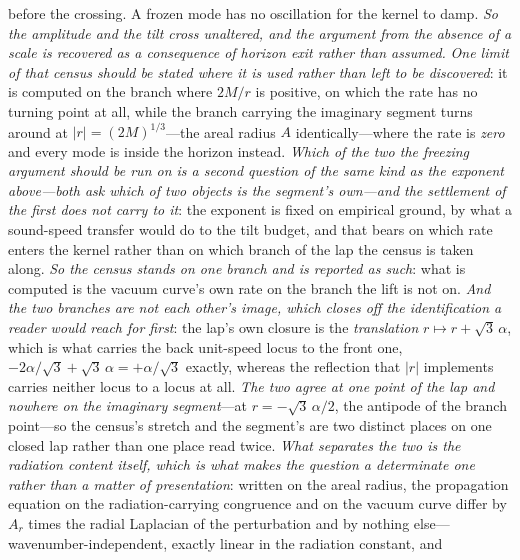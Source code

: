 \documentclass[11pt,a4paper]{article}
\theoremstyle{plain}
\theoremstyle{definition}
\theoremstyle{remark}
\begin{document}
before the crossing. A frozen mode has no oscillation for the kernel to damp. \emph{So the amplitude and the
tilt cross unaltered, and the argument from the absence of a scale is recovered as a consequence of horizon
exit rather than assumed.} \emph{One limit of that census should be stated where it is used rather than left
to be discovered}: it is computed on the branch where $2M/r$ is positive, on which the rate has no turning
point at all, while the branch carrying the imaginary segment turns around at
$\lvert r\rvert=(2M)^{1/3}$---the areal radius $A$ identically---where the rate is \emph{zero} and every mode
is inside the horizon instead. \emph{Which of the two the freezing argument should be run on is a second question of the same kind as the
exponent above---both ask which of two objects is the segment's own---and the settlement of the first does
not carry to it}: the exponent is fixed on empirical ground, by what a sound-speed transfer would do to the
tilt budget, and that bears on which rate enters the kernel rather than on which branch of the lap the census
is taken along. \emph{So the census stands on one branch and is reported as such}: what is computed is the
vacuum curve's own rate on the branch the lift is not
on.
\emph{And the two branches are not each other's image, which closes off the identification a reader would
reach for first}: the lap's own closure is the \emph{translation} $r\mapsto r+\sqrt3\,\alpha$, which is what
carries the back unit-speed locus to the front one, $-2\alpha/\sqrt3+\sqrt3\,\alpha=+\alpha/\sqrt3$ exactly,
whereas the reflection that $\lvert r\rvert$ implements carries neither locus to a locus at all. \emph{The two
agree at one point of the lap and nowhere on the imaginary segment}---at $r=-\sqrt3\,\alpha/2$, the antipode
of the branch point---so the census's stretch and the segment's are two distinct places on one closed lap
rather than one place read
twice.
\emph{What separates the two is the radiation content itself, which is what makes the question a determinate
one rather than a matter of presentation}: written on the areal radius, the propagation equation on the
radiation-carrying congruence and on the vacuum curve differ by $A_{r}$ times the radial Laplacian of the
perturbation and by nothing else---wavenumber-independent, exactly linear in the radiation constant, and
\end{document}
